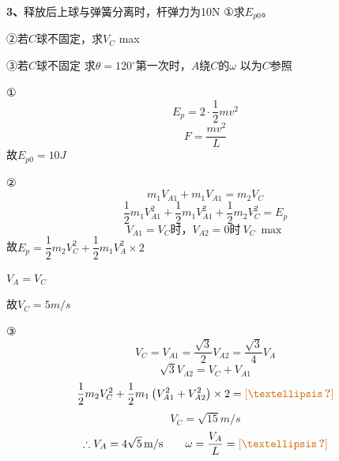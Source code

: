 \begin{problem}[3]
\textbf{3、}释放后上球与弹簧分离时，杆弹力为10N
①求$E_{p0}$。

②若$C$球不固定，求$V_C$ max

③若$C$球不固定 求$\theta=120^\circ$第一次时，$A$绕$C$的$\omega$
以为$C$参照
\begin{solution}
①
\[ E_p=2\cdot\dfrac{1}{2}mv^2 \]
\[ F=\dfrac{mv^2}{L} \]
故$E_{p0}=10\unit{J}$

②
\[ m_1V_{A1}+m_1V_{A1}=m_2V_C \]
\[ \dfrac{1}{2}m_1V_{A1}^2+\dfrac{1}{2}m_1V_{A1}^2+\dfrac{1}{2}m_2V_C^2=E_p \] %
\[ V_{A1}=V_C\text{时，}V_{A2}=0\text{时}\ V_C\ \max \]
故$E_p=\dfrac{1}{2}m_2V_C^2+\dfrac{1}{2}m_1V_A^2\times2$

$V_A=V_C$

故$V_C=5\unit{m/s}$

③
\[ V_C=V_{A1}=\dfrac{\sqrt{3}}{2}V_{A2}=\dfrac{\sqrt{3}}{4}V_A \]
\[ \sqrt{3}V_{A2}=V_C+V_{A1} \]
\[ \dfrac{1}{2}m_2V_C^2+\dfrac{1}{2}m_1\left(V_{A1}^2+V_{A2}^2\right)\times2=\unclear{…} \] %
\[ V_C=\sqrt{15}\unit{m/s} \]
\[ \therefore V_A=4\sqrt{5}\unit{m/s}\qquad \omega=\dfrac{V_A}{L}=\unclear{…} \] %
\end{solution}
\end{problem}

